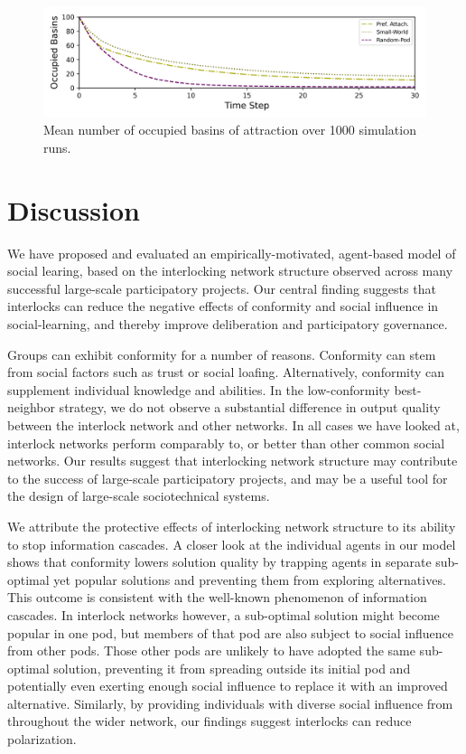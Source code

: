 \documentclass[manuscript,screen,review,acmsmall]{acmart}
\begin{document}
\begin{figure}
\begin{center}
\includegraphics[width=5in]{fig-conform-basin.png}
\caption{Mean number of occupied basins of attraction over 1000 simulation runs.}
\label{fig:basins}
\end{center}
\end{figure}

\section{Discussion}
We have proposed and evaluated an empirically-motivated, agent-based model of social learing,
based on the interlocking network structure observed across many successful large-scale participatory projects.
Our central finding suggests that interlocks can reduce the negative effects of conformity and social influence in social-learning,
and thereby improve deliberation and participatory governance.

Groups can exhibit conformity for a number of reasons.
Conformity can stem from social factors such as trust or social loafing.
Alternatively, conformity can supplement individual knowledge and abilities.
In the low-conformity best-neighbor strategy, we do not observe a substantial difference in output quality between the interlock network and other networks. In all cases we have looked at, interlock networks perform comparably to,
or better than other common social networks. 
Our results suggest that interlocking network structure may contribute to the success of large-scale participatory projects, and may be a useful tool for the design of large-scale sociotechnical systems.

We attribute the protective effects of interlocking network structure to its ability to stop information cascades.
A closer look at the individual agents in our model shows that conformity lowers solution quality by trapping agents in separate sub-optimal yet popular solutions and preventing them from exploring alternatives.
This outcome is consistent with the well-known phenomenon of information cascades.
In interlock networks however, a sub-optimal solution might become popular in one pod,
but members of that pod are also subject to social influence from other pods.
Those other pods are unlikely to have adopted the same sub-optimal solution,
preventing it from spreading outside its initial pod and potentially even exerting enough social influence to replace it with an improved alternative.
Similarly, by providing individuals with diverse social influence from throughout the wider network, our findings suggest interlocks can reduce polarization.
\end{document}
